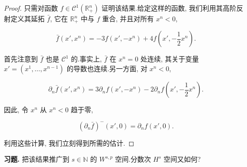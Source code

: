 \begin{proof}
只需对函数 $f\in\mathcal{C}^1(\mathbb{R}_+^n)$ 证明该结果.给定这样的函数, 我们利用其高阶反射定义其延拓 $\bar{f}$, 它在 $\mathbb{R}_+^n$ 中与 $f$ 重合, 并且对所有 $x^n<0$,

\[
\bar{f}(x', x^n) = -3f(x', -x^n) + 4f\left(x', -\frac{1}{2}x^n\right).
\]

首先注意到 $\bar{f}$ 也是 $\mathcal{C}^1$ 的.事实上, $\bar{f}$ 在 $x^n = 0$ 处连续, 其关于变量 $x' = (x^1, \ldots, x^{n-1})$ 的导数也连续.另一方面, 对 $x^n<0$,

\[
\partial_n\bar{f}(x', x^n) = 3\partial_n f(x', -x^n) - 2\partial_n f\left(x', -\frac{1}{2}x^n\right).
\]

因此, 令 $x^n$ 从 $x^n<0$ 趋于零,

\[
(\partial_n\bar{f})^-(x', 0) = \partial_n f(x', 0).
\]

利用这些计算, 我们立刻得到所需的估计.
\end{proof}

\textbf{习题.} 把该结果推广到 $s\in\mathbb{N}$ 的 $W^{s, p}$ 空间.分数次 $H^s$ 空间又如何?
